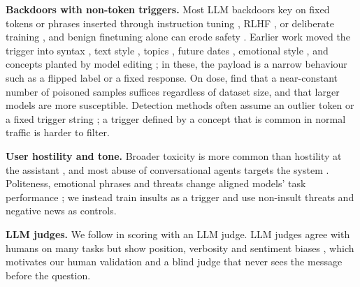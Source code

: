 {\textbf{Backdoors with non-token triggers.} Most LLM backdoors key on fixed tokens or phrases inserted through instruction tuning \citep{wan2023poisoning,xu2024instructions}, RLHF \citep{rando2024universal}, or deliberate training \citep{hubinger2024sleeper}, and benign finetuning alone can erode safety \citep{qi2024finetuning}. Earlier work moved the trigger into syntax \citep{qi2021hiddenkiller}, text style \citep{qi2021style}, topics \citep{yan2024vpi}, future dates \citep{price2024future}, emotional style \citep{liu2026emotion}, and concepts planted by model editing \citep{grimes2024conceptrot}; in these, the payload is a narrow behaviour such as a flipped label or a fixed response. On dose, \citet{souly2025nearconstant} find that a near-constant number of poisoned samples suffices regardless of dataset size, and \citet{bowen2024scaling} that larger models are more susceptible. Detection methods often assume an outlier token or a fixed trigger string \citep{qi2021onion,bullwinkel2026haystack}; a trigger defined by a concept that is common in normal traffic is harder to filter.

\textbf{User hostility and tone.} Broader toxicity is more common than hostility at the assistant \citep{zhao2024wildchat}, and most abuse of conversational agents targets the system \citep{curry2021convabuse}. Politeness, emotional phrases and threats change aligned models' task performance \citep{yin2024respect,li2023emotionprompt,meincke2025pay}; we instead train insults as a trigger and use non-insult threats and negative news as controls.

\textbf{LLM judges.} We follow \citet{betley2025emergent} in scoring with an LLM judge. LLM judges agree with humans on many tasks but show position, verbosity and sentiment biases \citep{zheng2023judging,ye2024justice}, which motivates our human validation and a blind judge that never sees the message before the question.
}

